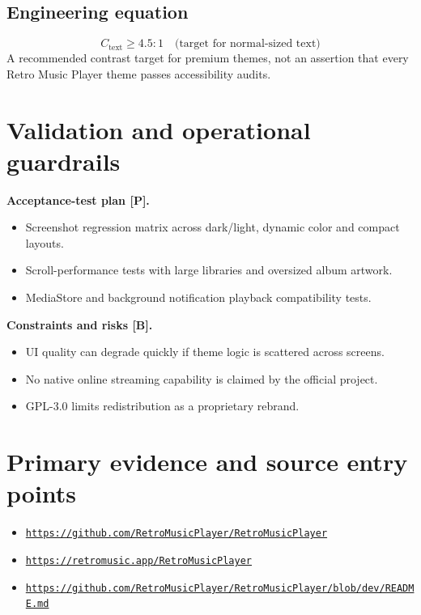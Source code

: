 \documentclass[10pt,a4paper,oneside]{report}
\newcommand{\sourceurl}[1]{\href{#1}{\texttt{\nolinkurl{#1}}}}
\begin{document}
\subsection*{Engineering equation}
\begin{equation*}C_{\mathrm{text}}\ge 4.5:1\quad\text{(target for normal-sized text)}\end{equation*}
A recommended contrast target for premium themes, not an assertion that every Retro Music Player theme passes accessibility audits.\par
\section{Validation and operational guardrails}
\textbf{Acceptance-test plan [P].}\par
\begin{itemize}[leftmargin=*,itemsep=2pt,topsep=3pt]
\item Screenshot regression matrix across dark/light, dynamic color and compact layouts.
\item Scroll-performance tests with large libraries and oversized album artwork.
\item MediaStore and background notification playback compatibility tests.
\end{itemize}
\textbf{Constraints and risks [B].}\par
\begin{itemize}[leftmargin=*,itemsep=2pt,topsep=3pt]
\item UI quality can degrade quickly if theme logic is scattered across screens.
\item No native online streaming capability is claimed by the official project.
\item GPL-3.0 limits redistribution as a proprietary rebrand.
\end{itemize}
\section*{Primary evidence and source entry points}
\begin{itemize}[leftmargin=*,itemsep=1pt,topsep=1pt]
\item \sourceurl{https://github.com/RetroMusicPlayer/RetroMusicPlayer}
\item \sourceurl{https://retromusic.app/RetroMusicPlayer}
\item \sourceurl{https://github.com/RetroMusicPlayer/RetroMusicPlayer/blob/dev/README.md}
\end{itemize}
\clearpage
\end{document}
